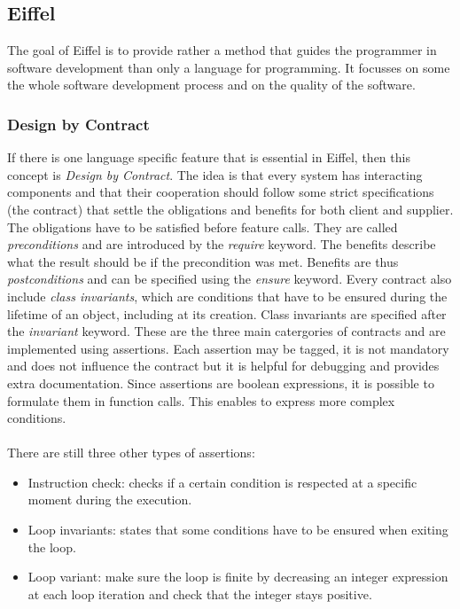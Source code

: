 \documentclass[12pt,a4paper,twocolumn]{article}
\begin{document}
\subsection{Eiffel}
The goal of Eiffel is to provide rather a method that guides the programmer in software development than only a language for programming. It focusses on some the whole software development process and on the quality of the software. 
\subsubsection{Design by Contract}
If there is one language specific feature that is essential in Eiffel, then this concept is \emph{Design by Contract}. The idea is that every system has interacting components and that their cooperation should follow some strict specifications (the contract) that settle the obligations and benefits for both client and supplier. The obligations have to be satisfied before feature calls. They are called \emph{preconditions} and are introduced by the \emph{require} keyword. The benefits describe what the result should be if the precondition was met. Benefits are thus \emph{postconditions} and can be specified using the \emph{ensure} keyword. Every contract also include \emph{class invariants}, which are conditions that have to be ensured during the lifetime of an object, including at its creation. Class invariants are specified after the \emph{invariant} keyword. These are the three main catergories of contracts and are implemented using assertions. Each assertion may be tagged, it is not mandatory and does not influence the contract but it is helpful for debugging and provides extra documentation. Since assertions are boolean expressions, it is possible to formulate them in function calls. This enables to express more complex conditions.
\\
\\
There are still three other types of assertions: 
\begin{itemize}
\item Instruction check: checks if a certain condition is respected at a specific moment during the execution.
\item Loop invariants: states that some conditions have to be ensured when exiting the loop.
\item Loop variant: make sure the loop is finite by decreasing an integer expression at each loop iteration and check that the integer stays positive.
\end{itemize}
\end{document}
